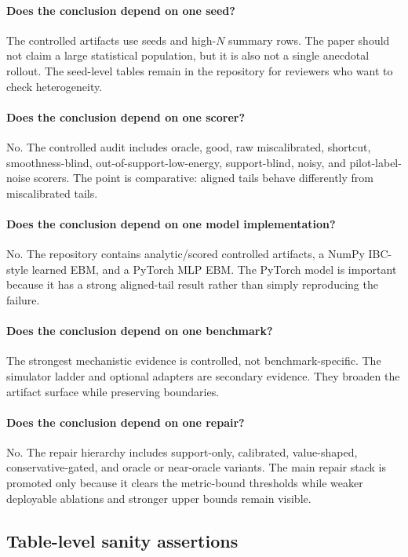 \paragraph{Does the conclusion depend on one seed?}
The controlled artifacts use \VFourEBMControlledSeeds{} seeds and
\VFourEBMHighNRows{} high-\(N\) summary rows. The paper should not claim a
large statistical population, but it is also not a single anecdotal rollout.
The seed-level tables remain in the repository for reviewers who want to check
heterogeneity.

\paragraph{Does the conclusion depend on one scorer?}
No. The controlled audit includes oracle, good, raw miscalibrated, shortcut,
smoothness-blind, out-of-support-low-energy, support-blind, noisy, and
pilot-label-noise scorers. The point is comparative: aligned tails behave
differently from miscalibrated tails.

\paragraph{Does the conclusion depend on one model implementation?}
No. The repository contains analytic/scored controlled artifacts, a NumPy
IBC-style learned EBM, and a PyTorch MLP EBM. The PyTorch model is important
because it has a strong aligned-tail result rather than simply reproducing the
failure.

\paragraph{Does the conclusion depend on one benchmark?}
The strongest mechanistic evidence is controlled, not benchmark-specific.
The simulator ladder and optional adapters are secondary evidence. They broaden
the artifact surface while preserving boundaries.

\paragraph{Does the conclusion depend on one repair?}
No. The repair hierarchy includes support-only, calibrated, value-shaped,
conservative-gated, and oracle or near-oracle variants. The main repair stack
is promoted only because it clears the metric-bound thresholds while weaker
deployable ablations and stronger upper bounds remain visible.

\subsection{Table-level sanity assertions}
\label{app:V4-table-sanity}

